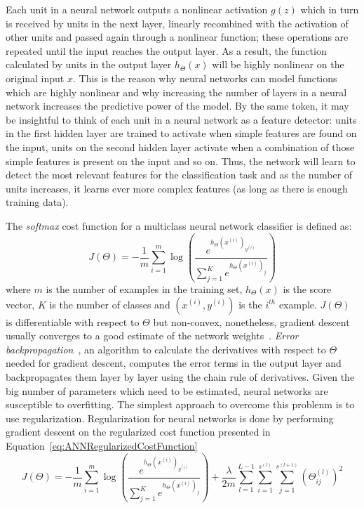 Each unit in a neural network outputs a nonlinear activation $g(z)$ which in turn is received by units in the next layer, linearly recombined with the activation of other units and passed again through a nonlinear function; these operations are repeated until the input reaches the output layer. As a result, the function calculated by units in the output layer $h_\Theta(x)$ will be highly nonlinear on the original input $x$. This is the reason why neural networks can model functions which are highly nonlinear and why increasing the number of layers in a neural network increases the predictive power of the model. By the same token, it may be insightful to think of each unit in a neural network as a feature detector: units in the first hidden layer are trained to activate when simple features are found on the input, units on the second hidden layer activate when a combination of those simple features is present on the input and so on. Thus, the network will learn to detect the most relevant features for the classification task and as the number of units increases, it learns ever more complex features (as long as there is enough training data).

The \emph{softmax} cost function for a multiclass neural network classifier is defined as:
\begin{equation}
	J(\Theta) = -\frac{1}{m} \sum_{i=1}^m \log \left ( \frac{ e^{h_\Theta(x^{(i)})_{y^{(i)}}} }{ \sum_{j=1}^K e^{ h_\Theta (x^{(i)})_j} } \right )
\end{equation}
where $m$ is the number of examples in the training set, $h_\Theta(x)$ is the score vector, $K$ is the number of classes and $(x^{(i)},y^{(i)})$ is the $i^{th}$ example. $J(\Theta)$ is differentiable with respect to $\Theta$ but non-convex, nonetheless, gradient descent usually converges to a good estimate of the network weights~\cite{Ng2014}. \emph{Error backpropagation}~\cite{Linnainmaa1970, Werbos1974}, an algorithm to calculate the derivatives with respect to $\Theta$ needed for gradient descent, computes the error terms in the output layer and backpropagates them layer by layer using the chain rule of derivatives. Given the big number of parameters which need to be estimated, neural networks are susceptible to overfitting. The simplest approach to overcome this problenm is to use regularization. Regularization for neural networks is done by performing gradient descent on the regularized cost function presented in Equation~\ref{eq:ANNRegularizedCostFunction}
\begin{equation}
	J(\Theta) = -\frac{1}{m} \sum_{i=1}^m \log \left ( \frac{ e^{h_\Theta(x^{(i)})_{y^{(i)}}} }{ \sum_{j=1}^K e^{ h_\Theta (x^{(i)})_j} } \right ) + \frac{\lambda}{2m}\sum_{l=1}^{L-1}\sum_{i=1}^{s^{(l)}}\sum_{j=1}^{s^{(l+1)}} \left(\Theta^{(l)}_{ij}\right)^2
	\label{eq:ANNRegularizedCostFunction}
\end{equation}
